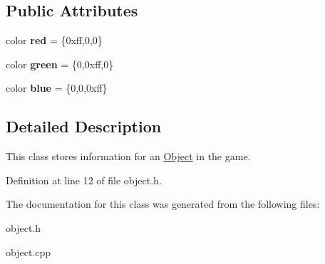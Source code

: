 \subsection*{Public Attributes}
\begin{DoxyCompactItemize}
\item 
color {\bfseries red} = \{0xff,0,0\}\hypertarget{classObject_af614f0ca72ca572b74886552bb8aa19b}{}\label{classObject_af614f0ca72ca572b74886552bb8aa19b}

\item 
color {\bfseries green} = \{0,0xff,0\}\hypertarget{classObject_a8f5119ace90c47b3d20d19b41027f85c}{}\label{classObject_a8f5119ace90c47b3d20d19b41027f85c}

\item 
color {\bfseries blue} = \{0,0,0xff\}\hypertarget{classObject_a4bfc5def477cc3d742b571d65f043fa4}{}\label{classObject_a4bfc5def477cc3d742b571d65f043fa4}

\end{DoxyCompactItemize}


\subsection{Detailed Description}
This class stores information for an \hyperlink{classObject}{Object} in the game. 

Definition at line 12 of file object.\+h.



The documentation for this class was generated from the following files\+:\begin{DoxyCompactItemize}
\item 
object.\+h\item 
object.\+cpp\end{DoxyCompactItemize}
